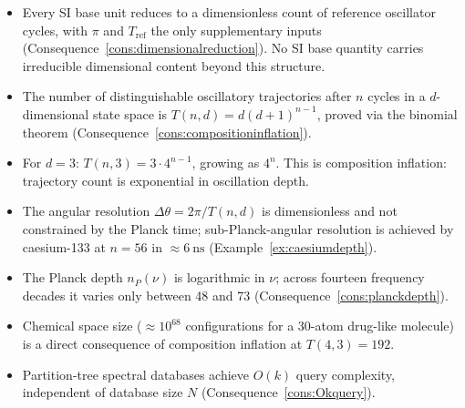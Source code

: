 \bigskip
\begin{tcolorbox}[colback=crownblue!5, colframe=crownblue!60!black,
                  title={\textbf{Chapter 19 Summary}}]
\begin{itemize}[noitemsep]
  \item Every SI base unit reduces to a dimensionless count of reference
    oscillator cycles, with $\pi$ and $T_{\mathrm{ref}}$ the only supplementary
    inputs (Consequence~\ref{cons:dimensionalreduction}).
    No SI base quantity carries irreducible dimensional content beyond this
    structure.
  \item The number of distinguishable oscillatory trajectories after $n$ cycles
    in a $d$-dimensional state space is $T(n,d) = d(d+1)^{n-1}$, proved via the
    binomial theorem (Consequence~\ref{cons:compositioninflation}).
  \item For $d = 3$: $T(n,3) = 3\cdot 4^{n-1}$, growing as $4^{n}$.
    This is composition inflation: trajectory count is exponential in oscillation
    depth.
  \item The angular resolution $\Delta\theta = 2\pi/T(n,d)$ is dimensionless and
    not constrained by the Planck time; sub-Planck-angular resolution is achieved
    by caesium-133 at $n = 56$ in $\approx 6~\mathrm{ns}$
    (Example~\ref{ex:caesiumdepth}).
  \item The Planck depth $n_{P}(\nu)$ is logarithmic in $\nu$; across fourteen
    frequency decades it varies only between 48 and 73
    (Consequence~\ref{cons:planckdepth}).
  \item Chemical space size ($\approx 10^{68}$ configurations for a 30-atom
    drug-like molecule) is a direct consequence of composition inflation at
    $T(4,3) = 192$.
  \item Partition-tree spectral databases achieve $O(k)$ query complexity,
    independent of database size $N$ (Consequence~\ref{cons:Okquery}).
\end{itemize}
\end{tcolorbox}

